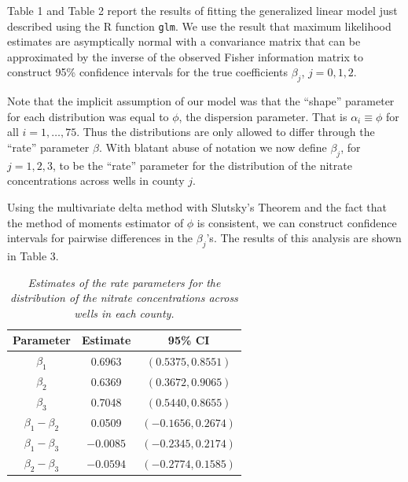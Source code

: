 \documentclass[12pt]{article}
\begin{document}
\begin{enumerate}
    Table 1 and Table 2 report the results of fitting the generalized linear model just described using the R function \texttt{glm}.
    We use the result that maximum likelihood estimates are asymptically normal with a convariance matrix that can be approximated by the inverse of
    the observed Fisher information matrix to construct 95\% confidence intervals for the true coefficients $\beta_{j}$, $j = 0, 1, 2$.

    Note that the implicit assumption of our model was that the ``shape'' parameter for each distribution was equal to $\phi$, the dispersion
    parameter. That is $\alpha_i \equiv \phi$ for all $i = 1, \dots, 75$. Thus the distributions are only allowed to differ through the ``rate''
    parameter $\beta$. With blatant abuse of notation we now define $\beta_j$, for $j = 1, 2, 3$, to be the ``rate'' parameter for the distribution of
    the nitrate concentrations across wells in county $j$. 
    
    Using the multivariate delta method with Slutsky's Theorem and the fact that the method of
    moments estimator of $\phi$ is consistent, we can construct confidence intervals for pairwise differences in the $\beta_{j}$'s.
    The results of this analysis are shown in Table 3.

    \begin{table}[h]
      \caption{\emph{Estimates of the rate parameters for the distribution of the nitrate concentrations across wells in each county.}}
      \vspace{.5cm}
      \centering
      \begin{tabular}{|c|c|c|}
        \hline
        Parameter & Estimate & 95\% CI \\
        \hline
        $\beta_1$ & 0.6963 & $(0.5375,0.8551)$ \\
        \hline
        $\beta_2$ & 0.6369 & $(0.3672, 0.9065)$ \\
        \hline
        $\beta_3$ & 0.7048 & $(0.5440, 0.8655)$ \\
        \hline
        $\beta_1 - \beta_2$ & 0.0509 & $(-0.1656, 0.2674)$ \\
        \hline
        $\beta_1 - \beta_3$ & $-0.0085$ & $(-0.2345, 0.2174)$ \\
        \hline
        $\beta_2 - \beta_3$ & $-0.0594$ & $(-0.2774, 0.1585)$ \\
        \hline
      \end{tabular}
      \label{tab:3}
    \end{table}


\end{enumerate}
\end{document}
